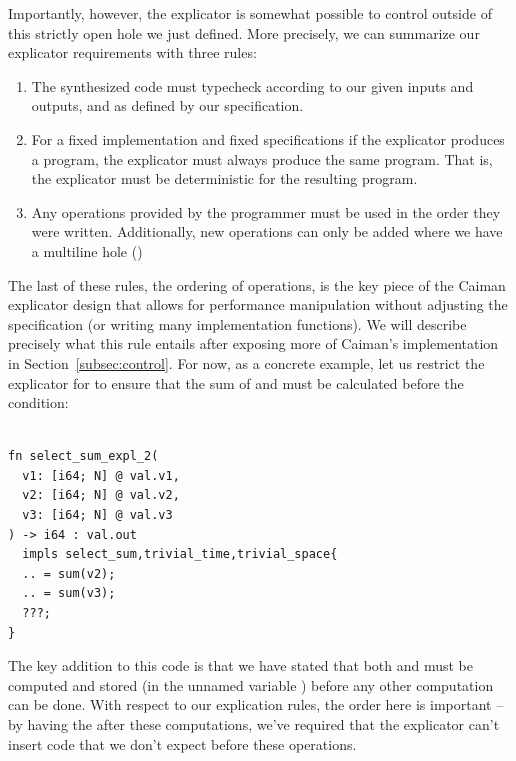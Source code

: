Importantly, however, the explicator is somewhat possible to control outside of this strictly open  hole we just defined.  More precisely, we can summarize our explicator requirements with three rules:
%
\begin{enumerate}
\item The synthesized code must typecheck according to our given inputs and outputs, and as defined by our specification.
\item For a fixed implementation and fixed specifications if the explicator produces a program, the explicator must always produce the same program.  That is, the explicator must be deterministic for the resulting program.
\item Any operations provided by the programmer must be used in the order they were written.  Additionally, new operations can only be added where we have a multiline hole ()
\end{enumerate}
%
The last of these rules, the ordering of operations, is the key piece of the Caiman explicator design that allows for performance manipulation without adjusting the specification (or writing many implementation functions).  We will describe precisely what this rule entails after exposing more of Caiman's implementation in Section~\ref{subsec:control}.  For now, as a concrete example, let us restrict the explicator for  to ensure that the sum of  and  must be calculated before the condition:
%
\begin{lstlisting}

fn select_sum_expl_2(
  v1: [i64; N] @ val.v1,
  v2: [i64; N] @ val.v2,
  v3: [i64; N] @ val.v3
) -> i64 : val.out 
  impls select_sum,trivial_time,trivial_space{
  .. = sum(v2);
  .. = sum(v3);
  ???;
}
\end{lstlisting}
%
The key addition to this code is that we have stated that both  and  must be computed and stored (in the unnamed variable ) before any other computation can be done.  With respect to our explication rules, the order here is important -- by having the  after these computations, we've required that the explicator can't insert code that we don't expect before these operations.

